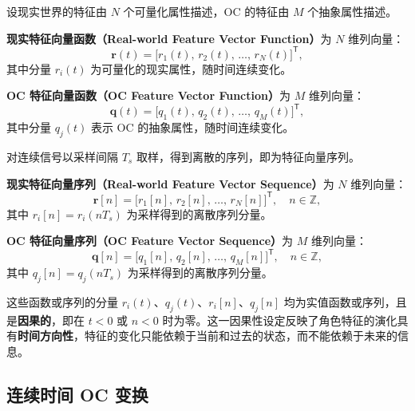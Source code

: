 \begin{definition}[特征向量函数]
    设现实世界的特征由 $N$ 个可量化属性描述，OC 的特征由 $M$ 个抽象属性描述。

    \textbf{现实特征向量函数（Real-world Feature Vector Function）}为 $N$ 维列向量：
    \begin{equation}
        \mathbf{r}(t)=\bigl[r_1(t),\,r_2(t),\,\dots,\,r_N(t)\bigr]^{\mathsf{T}},
    \end{equation}
    其中分量 $r_i(t)$ 为可量化的现实属性，随时间连续变化。

    \textbf{OC 特征向量函数（OC Feature Vector Function）}为 $M$ 维列向量：
    \begin{equation}
        \mathbf{q}(t)=\bigl[q_1(t),\,q_2(t),\,\dots,\,q_M(t)\bigr]^{\mathsf{T}},
    \end{equation}
    其中分量 $q_j(t)$ 表示 OC 的抽象属性，随时间连续变化。
\end{definition}
对连续信号以采样间隔 $T_s$ 取样，得到离散的序列，即为特征向量序列。
\begin{definition}[特征向量序列]
    \textbf{现实特征向量序列（Real-world Feature Vector Sequence）}为 $N$ 维列向量：
    \begin{equation}
        \mathbf{r}[n]=\bigl[r_1[n],\,r_2[n],\,\dots,\,r_N[n]\bigr]^{\mathsf{T}},\quad n\in\mathbb{Z},
    \end{equation}
    其中 $r_i[n]=r_i(nT_s)$ 为采样得到的离散序列分量。

    \textbf{OC 特征向量序列（OC Feature Vector Sequence）}为 $M$ 维列向量：
    \begin{equation}
        \mathbf{q}[n]=\bigl[q_1[n],\,q_2[n],\,\dots,\,q_M[n]\bigr]^{\mathsf{T}},\quad n\in\mathbb{Z},
    \end{equation}
    其中 $q_j[n]=q_j(nT_s)$ 为采样得到的离散序列分量。
\end{definition}

\begin{remark}
    这些函数或序列的分量 $r_i(t)$、$q_j(t)$、$r_i[n]$、$q_j[n]$ 均为实值函数或序列，且是\textbf{因果的}，即在 $t<0$ 或 $n<0$ 时为零。这一因果性设定反映了角色特征的演化具有\textbf{时间方向性}，特征的变化只能依赖于当前和过去的状态，而不能依赖于未来的信息。
\end{remark}


\subsection{连续时间 OC 变换}

